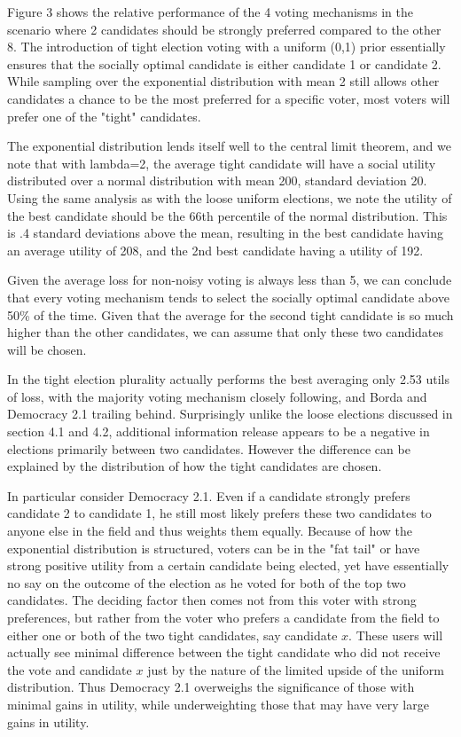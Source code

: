 \documentclass[11pt]{scrartcl}
\begin{document}
Figure 3 shows the relative performance of the 4 voting mechanisms in the scenario where 2 candidates should be strongly preferred compared to the other 8. The introduction of tight election voting with a uniform (0,1) prior essentially ensures that the socially optimal candidate is either candidate 1 or candidate 2. While sampling over the exponential distribution with mean 2 still allows other candidates a chance to be the most preferred for a specific voter, most voters will prefer one of the "tight" candidates.

The exponential distribution lends itself well to the central limit theorem, and we note that with lambda=2, the average tight candidate will have a social utility distributed over a normal distribution with mean 200, standard deviation 20. Using the same analysis as with the loose uniform elections, we note the utility of the best candidate should be the $66$th percentile of the normal distribution. This is .4 standard deviations above the mean, resulting in the best candidate having an average utility of 208, and the 2nd best candidate having a utility of 192.

Given the average loss for non-noisy voting is always less than 5, we can conclude that every voting mechanism tends to select the socially optimal candidate above 50\% of the time. Given that the average for the second tight candidate is so much higher than the other candidates, we can assume that only these two candidates will be chosen.

In the tight election plurality actually performs the best averaging only 2.53 utils of loss, with the majority voting mechanism closely following, and Borda and Democracy 2.1 trailing behind. Surprisingly unlike the loose elections discussed in section 4.1 and 4.2, additional information release appears to be a negative in elections primarily between two candidates. However the difference can be explained by the distribution of how the tight candidates are chosen.

In particular consider Democracy 2.1. Even if a candidate strongly prefers candidate 2 to candidate 1, he still most likely prefers these two candidates to anyone else in the field and thus weights them equally.  Because of how the exponential distribution is structured, voters can be in the "fat tail" or have strong positive utility from a certain candidate being elected, yet have essentially no say on the outcome of the election as he voted for both of the top two candidates. The deciding factor then comes not from this voter with strong preferences, but rather from the voter who prefers a candidate from the field to either one or both of the two tight candidates, say candidate $x$. These users will actually see minimal difference between the tight candidate who did not receive the vote and candidate $x$ just by the nature of the limited upside of the uniform distribution. Thus Democracy 2.1 overweighs the significance of those with minimal gains in utility, while underweighting those that may have very large gains in utility.
\end{document}
